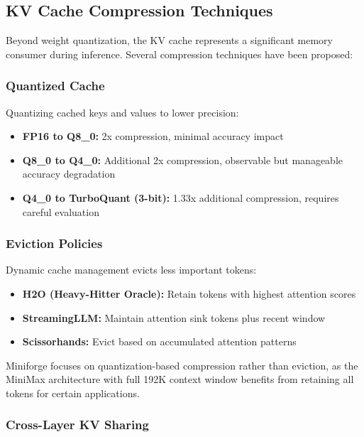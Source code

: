 \subsection{KV Cache Compression Techniques}

Beyond weight quantization, the KV cache represents a significant memory consumer during inference. Several compression techniques have been proposed:

\subsubsection{Quantized Cache}

Quantizing cached keys and values to lower precision:

\begin{itemize}
    \item \textbf{FP16 to Q8\_0:} 2x compression, minimal accuracy impact
    \item \textbf{Q8\_0 to Q4\_0:} Additional 2x compression, observable but manageable accuracy degradation
    \item \textbf{Q4\_0 to TurboQuant (3-bit):} 1.33x additional compression, requires careful evaluation
\end{itemize}

\subsubsection{Eviction Policies}

Dynamic cache management evicts less important tokens:

\begin{itemize}
    \item \textbf{H2O (Heavy-Hitter Oracle):} Retain tokens with highest attention scores
    \item \textbf{StreamingLLM:} Maintain attention sink tokens plus recent window
    \item \textbf{Scissorhands:} Evict based on accumulated attention patterns
\end{itemize}

Miniforge focuses on quantization-based compression rather than eviction, as the MiniMax architecture with full 192K context window benefits from retaining all tokens for certain applications.

\subsubsection{Cross-Layer KV Sharing}

